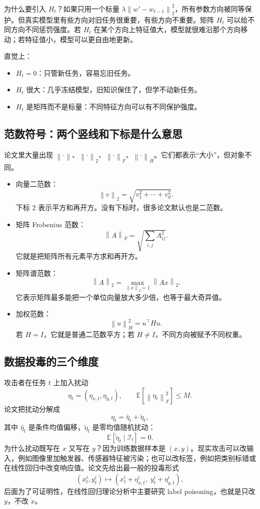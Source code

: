 \documentclass[UTF8,fontset=none,11pt]{ctexart}
\theoremstyle{cnstyle}
\newcommand{\E}{\mathbb{E}}
\newcommand{\calI}{\mathcal{I}}
\newcommand{\norm}[1]{\left\lVert #1\right\rVert}
\newcommand{\fnorm}[1]{\left\lVert #1\right\rVert_F}
\begin{document}
为什么要引入 \(H_t\)？如果只用一个标量 \(\lambda\norm{w'-w_{t-1}}_2^2\)，所有参数方向被同等保护。但真实模型里有些方向对旧任务很重要，有些方向不重要。矩阵 \(H_t\) 可以给不同方向不同惩罚强度。若 \(H_t\) 在某个方向上特征值大，模型就很难沿那个方向移动；若特征值小，模型可以更自由地更新。

直觉上：
\begin{itemize}
  \item \(H_t=0\)：只管新任务，容易忘旧任务。
  \item \(H_t\) 很大：几乎冻结模型，旧知识保住了，但学不动新任务。
  \item \(H_t\) 是矩阵而不是标量：不同特征方向可以有不同保护强度。
\end{itemize}

\subsection{范数符号：两个竖线和下标是什么意思}

论文里大量出现 \(\norm{\cdot}\)、\(\norm{\cdot}_2\)、\(\fnorm{\cdot}\)、\(\norm{\cdot}_{H}\)。它们都表示“大小”，但对象不同。

\begin{itemize}
  \item 向量二范数：
  \[
    \norm{v}_2=\sqrt{v_1^2+\cdots+v_d^2}.
  \]
  下标 \(2\) 表示平方和再开方。没有下标时，很多论文默认也是二范数。

  \item 矩阵 Frobenius 范数：
  \[
    \norm{A}_F=\sqrt{\sum_{i,j}A_{ij}^2}.
  \]
  它就是把矩阵所有元素平方求和再开方。

  \item 矩阵谱范数：
  \[
    \norm{A}_2=\max_{\norm{x}_2=1}\norm{Ax}_2.
  \]
  它表示矩阵最多能把一个单位向量放大多少倍，也等于最大奇异值。

  \item 加权范数：
  \[
    \norm{u}_{H}^2=u^\top Hu.
  \]
  若 \(H=I\)，它就是普通二范数平方；若 \(H\neq I\)，不同方向被赋予不同权重。
\end{itemize}

\subsection{数据投毒的三个维度}

攻击者在任务 \(t\) 上加入扰动
\[
  \eta_t=(\eta_{x,t},\eta_{y,t}),\qquad
  \E[\fnorm{\eta_t}^2]\le M .
\]
论文把扰动分解成
\[
  \eta_t=\hat\eta_t+\tilde\eta_t ,
\]
其中 \(\hat\eta_t\) 是条件均值偏移，\(\tilde\eta_t\) 是零均值随机扰动：
\[
  \E[\tilde\eta_t\mid\calI_t]=0 .
\]
为什么扰动既写在 \(x\) 又写在 \(y\)？因为训练数据样本是 \((x,y)\)。现实攻击可以改输入，例如图像里加触发器、传感器特征被污染；也可以改标签，例如把类别标错或在线性回归中改变响应值。论文先给出最一般的投毒形式
\[
  (x_t^i,y_t^i)\mapsto(x_t^i+\eta_{x,t}^i,\;y_t^i+\eta_{y,t}^i),
\]
后面为了可证明性，在线性回归理论分析中主要研究 label poisoning，也就是只改 \(y\)，不改 \(x\)。
\end{document}
